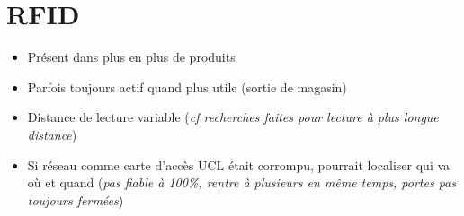 
\section{RFID}

\begin{itemize}
\item Présent dans plus en plus de produits
\item Parfois toujours actif quand plus utile (sortie de magasin)
\item Distance de lecture variable (\emph{cf recherches faites pour lecture à plus longue distance})
\item Si réseau comme carte d'accès UCL était corrompu, pourrait localiser qui va où et quand (\emph{pas fiable à 100\%, rentre à plusieurs en même temps, portes pas toujours fermées})
\end{itemize}

